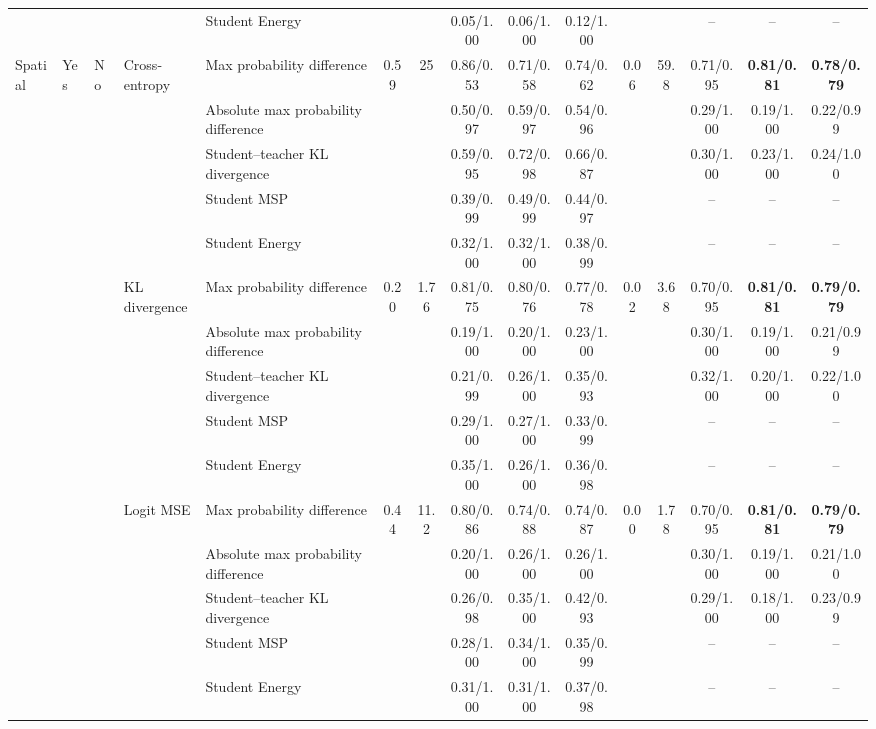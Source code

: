 \documentclass[border=2pt]{standalone}
\begin{document}
\begin{tabular}{lllllcccccccccc}
 &  &  &  & Student Energy &  &  & 0.05/1.00 & 0.06/1.00 & 0.12/1.00 &  &  & -- & -- & -- \\
\addlinespace
Spatial & Yes & No & Cross-entropy & Max probability difference & 0.59 & 25 & 0.86/0.53 & 0.71/0.58 & 0.74/0.62 & 0.06 & 59.8 & 0.71/0.95 & \textbf{0.81/0.81} & \textbf{0.78/0.79} \\
 &  &  &  & Absolute max probability difference &  &  & 0.50/0.97 & 0.59/0.97 & 0.54/0.96 &  &  & 0.29/1.00 & 0.19/1.00 & 0.22/0.99 \\
 &  &  &  & Student--teacher KL divergence &  &  & 0.59/0.95 & 0.72/0.98 & 0.66/0.87 &  &  & 0.30/1.00 & 0.23/1.00 & 0.24/1.00 \\
 &  &  &  & Student MSP &  &  & 0.39/0.99 & 0.49/0.99 & 0.44/0.97 &  &  & -- & -- & -- \\
 &  &  &  & Student Energy &  &  & 0.32/1.00 & 0.32/1.00 & 0.38/0.99 &  &  & -- & -- & -- \\
 &  &  & KL divergence & Max probability difference & 0.20 & 1.76 & 0.81/0.75 & 0.80/0.76 & 0.77/0.78 & 0.02 & 3.68 & 0.70/0.95 & \textbf{0.81/0.81} & \textbf{0.79/0.79} \\
 &  &  &  & Absolute max probability difference &  &  & 0.19/1.00 & 0.20/1.00 & 0.23/1.00 &  &  & 0.30/1.00 & 0.19/1.00 & 0.21/0.99 \\
 &  &  &  & Student--teacher KL divergence &  &  & 0.21/0.99 & 0.26/1.00 & 0.35/0.93 &  &  & 0.32/1.00 & 0.20/1.00 & 0.22/1.00 \\
 &  &  &  & Student MSP &  &  & 0.29/1.00 & 0.27/1.00 & 0.33/0.99 &  &  & -- & -- & -- \\
 &  &  &  & Student Energy &  &  & 0.35/1.00 & 0.26/1.00 & 0.36/0.98 &  &  & -- & -- & -- \\
 &  &  & Logit MSE & Max probability difference & 0.44 & 11.2 & 0.80/0.86 & 0.74/0.88 & 0.74/0.87 & 0.00 & 1.78 & 0.70/0.95 & \textbf{0.81/0.81} & \textbf{0.79/0.79} \\
 &  &  &  & Absolute max probability difference &  &  & 0.20/1.00 & 0.26/1.00 & 0.26/1.00 &  &  & 0.30/1.00 & 0.19/1.00 & 0.21/1.00 \\
 &  &  &  & Student--teacher KL divergence &  &  & 0.26/0.98 & 0.35/1.00 & 0.42/0.93 &  &  & 0.29/1.00 & 0.18/1.00 & 0.23/0.99 \\
 &  &  &  & Student MSP &  &  & 0.28/1.00 & 0.34/1.00 & 0.35/0.99 &  &  & -- & -- & -- \\
 &  &  &  & Student Energy &  &  & 0.31/1.00 & 0.31/1.00 & 0.37/0.98 &  &  & -- & -- & -- \\

\end{tabular}
\end{document}

